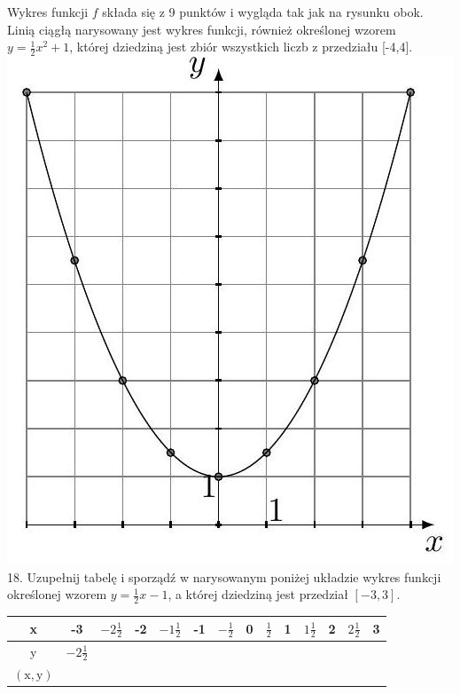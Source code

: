 \documentclass[10pt]{article}
\begin{document}
Wykres funkcji \(f\) składa się z 9 punktów i wygląda tak jak na rysunku obok.\\
Linią ciągłą narysowany jest wykres funkcji, również określonej wzorem \(y=\frac{1}{2} x^{2}+1\), której dziedziną jest zbiór wszystkich liczb z przedziału [-4,4].\\
\includegraphics[max width=\textwidth, center]{2024_11_21_e9b4faa005d5be2cc318g-129}\\
18. Uzupełnij tabelę i sporządź w narysowanym poniżej układzie wykres funkcji określonej wzorem \(y=\frac{1}{2} x-1\), a której dziedziną jest przedział \([-3,3]\).

\begin{center}
\begin{tabular}{|c|c|c|c|c|c|c|c|c|c|c|c|c|c|}
\hline
x & -3 & \(-2 \frac{1}{2}\) & -2 & \(-1 \frac{1}{2}\) & -1 & \(-\frac{1}{2}\) & 0 & \(\frac{1}{2}\) & 1 & \(1 \frac{1}{2}\) & 2 & \(2 \frac{1}{2}\) & 3 \\
\hline
y & \(-2 \frac{1}{2}\) &  &  &  &  &  &  &  &  &  &  &  &  \\
\hline
\((\mathrm{x}, \mathrm{y})\) &  &  &  &  &  &  &  &  &  &  &  &  &  \\
\hline
\end{tabular}
\end{center}
\end{document}
